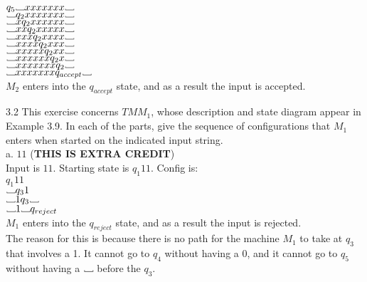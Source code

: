 \documentclass[12pt]{article}
\newcommand\Vtextvisiblespace[1][.8em]{%
	\mbox{\kern.07em\vrule height.3ex}%
	\vbox{\hrule width#1}%
	\hbox{\vrule height.3ex}}
\begin{document}
$q_5 \Vtextvisiblespace           xxxxxxx \Vtextvisiblespace  $  \\
$\Vtextvisiblespace           q_2 xxxxxxx \Vtextvisiblespace  $  \\
$\Vtextvisiblespace x         q_2 xxxxxx  \Vtextvisiblespace  $  \\
$\Vtextvisiblespace xx        q_2 xxxxx   \Vtextvisiblespace  $  \\
$\Vtextvisiblespace xxx       q_2 xxxx    \Vtextvisiblespace  $  \\
$\Vtextvisiblespace xxxx      q_2 xxx     \Vtextvisiblespace  $  \\
$\Vtextvisiblespace xxxxx     q_2 xx      \Vtextvisiblespace  $  \\
$\Vtextvisiblespace xxxxxx    q_2 x       \Vtextvisiblespace  $  \\
$\Vtextvisiblespace xxxxxxx   q_2         \Vtextvisiblespace  $  \\
$\Vtextvisiblespace xxxxxxx   q_{accept}  \Vtextvisiblespace  $  \\
$M_2$ enters into the $q_{accept}$ state, and as a result the input is accepted. \\

\pagebreak

3.2 This exercise concerns $TM M_1$, whose description and state diagram appear in 
Example 3.9. In each of the parts, give the sequence of configurations that $M_1$ 
enters when started on the indicated input string. \\

a. $11$ (\textbf{THIS IS EXTRA CREDIT}) \\

Input is $11$. Starting state is $q_1 11$. Config is: \\

$      q_1 11$ \\
$ \Vtextvisiblespace q_3 1 $ \\
$ \Vtextvisiblespace 1 q_3 \Vtextvisiblespace $ \\
$ \Vtextvisiblespace 1 \Vtextvisiblespace q_{reject} $ \\
$M_1$ enters into the $q_{reject}$ state, and as a result the input is rejected. \\

The reason for this is because there is no path for the machine $M_1$ to take at
$q_3$ that involves a 1. It cannot go to $q_4$ without having a 0, and it cannot
go to $q_5$ without having a $\Vtextvisiblespace$ before the $q_3$. \\
\end{document}

